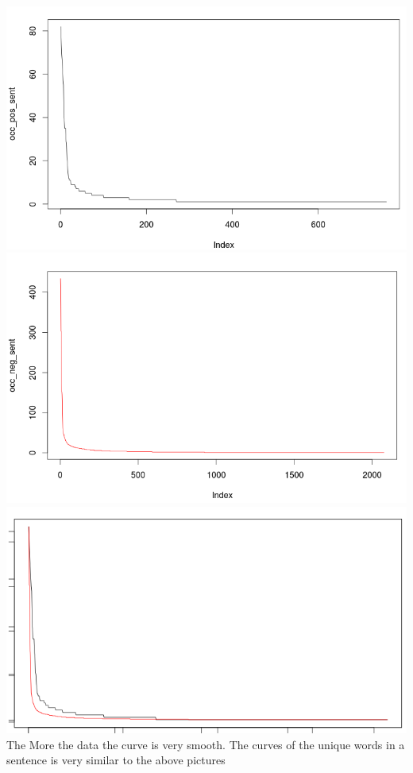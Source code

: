 \documentclass{article}
\begin{document}
\includegraphics[width=0.7\linewidth]{visual1.png}\includegraphics[width=0.7\linewidth]{visual2.png}\\
\includegraphics[width=0.9\linewidth]{visual1and2.png}\\

The More the data the curve is very smooth. The curves of the unique words in a sentence is very similar to the above pictures
\end{document}
